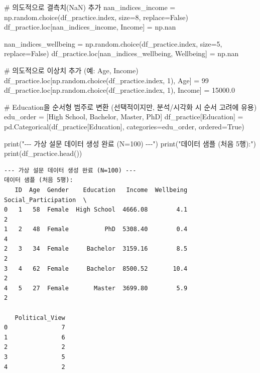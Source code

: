 \documentclass[
  letterpaper,
]{book}
\newenvironment{Shaded}{\begin{snugshade}}{\end{snugshade}}
\newcommand{\BuiltInTok}[1]{\textcolor[rgb]{0.00,0.23,0.31}{#1}}
\newcommand{\CommentTok}[1]{\textcolor[rgb]{0.37,0.37,0.37}{#1}}
\newcommand{\DecValTok}[1]{\textcolor[rgb]{0.68,0.00,0.00}{#1}}
\newcommand{\FloatTok}[1]{\textcolor[rgb]{0.68,0.00,0.00}{#1}}
\newcommand{\NormalTok}[1]{\textcolor[rgb]{0.00,0.23,0.31}{#1}}
\newcommand{\OperatorTok}[1]{\textcolor[rgb]{0.37,0.37,0.37}{#1}}
\newcommand{\StringTok}[1]{\textcolor[rgb]{0.13,0.47,0.30}{#1}}
\newcommand{\VariableTok}[1]{\textcolor[rgb]{0.07,0.07,0.07}{#1}}
\begin{document}
\begin{Shaded}
\begin{Highlighting}[]
\CommentTok{\# 의도적으로 결측치(NaN) 추가}
\NormalTok{nan\_indices\_income }\OperatorTok{=}\NormalTok{ np.random.choice(df\_practice.index, size}\OperatorTok{=}\DecValTok{8}\NormalTok{, replace}\OperatorTok{=}\VariableTok{False}\NormalTok{)}
\NormalTok{df\_practice.loc[nan\_indices\_income, }\StringTok{\textquotesingle{}Income\textquotesingle{}}\NormalTok{] }\OperatorTok{=}\NormalTok{ np.nan}

\NormalTok{nan\_indices\_wellbeing }\OperatorTok{=}\NormalTok{ np.random.choice(df\_practice.index, size}\OperatorTok{=}\DecValTok{5}\NormalTok{, replace}\OperatorTok{=}\VariableTok{False}\NormalTok{)}
\NormalTok{df\_practice.loc[nan\_indices\_wellbeing, }\StringTok{\textquotesingle{}Wellbeing\textquotesingle{}}\NormalTok{] }\OperatorTok{=}\NormalTok{ np.nan}

\CommentTok{\# 의도적으로 이상치 추가 (예: Age, Income)}
\NormalTok{df\_practice.loc[np.random.choice(df\_practice.index, }\DecValTok{1}\NormalTok{), }\StringTok{\textquotesingle{}Age\textquotesingle{}}\NormalTok{] }\OperatorTok{=} \DecValTok{99}
\NormalTok{df\_practice.loc[np.random.choice(df\_practice.index, }\DecValTok{1}\NormalTok{), }\StringTok{\textquotesingle{}Income\textquotesingle{}}\NormalTok{] }\OperatorTok{=} \FloatTok{15000.0}

\CommentTok{\# Education을 순서형 범주로 변환 (선택적이지만, 분석/시각화 시 순서 고려에 유용)}
\NormalTok{edu\_order }\OperatorTok{=}\NormalTok{ [}\StringTok{\textquotesingle{}High School\textquotesingle{}}\NormalTok{, }\StringTok{\textquotesingle{}Bachelor\textquotesingle{}}\NormalTok{, }\StringTok{\textquotesingle{}Master\textquotesingle{}}\NormalTok{, }\StringTok{\textquotesingle{}PhD\textquotesingle{}}\NormalTok{]}
\NormalTok{df\_practice[}\StringTok{\textquotesingle{}Education\textquotesingle{}}\NormalTok{] }\OperatorTok{=}\NormalTok{ pd.Categorical(df\_practice[}\StringTok{\textquotesingle{}Education\textquotesingle{}}\NormalTok{], categories}\OperatorTok{=}\NormalTok{edu\_order, ordered}\OperatorTok{=}\VariableTok{True}\NormalTok{)}

\BuiltInTok{print}\NormalTok{(}\StringTok{"{-}{-}{-} 가상 설문 데이터 생성 완료 (N=100) {-}{-}{-}"}\NormalTok{)}
\BuiltInTok{print}\NormalTok{(}\StringTok{"데이터 샘플 (처음 5행):"}\NormalTok{)}
\BuiltInTok{print}\NormalTok{(df\_practice.head())}
\end{Highlighting}
\end{Shaded}

\begin{verbatim}
--- 가상 설문 데이터 생성 완료 (N=100) ---
데이터 샘플 (처음 5행):
   ID  Age  Gender    Education   Income  Wellbeing  Social_Participation  \
0   1   58  Female  High School  4666.08        4.1                     2   
1   2   48  Female          PhD  5308.40        0.4                     4   
2   3   34  Female     Bachelor  3159.16        8.5                     2   
3   4   62  Female     Bachelor  8500.52       10.4                     2   
4   5   27  Female       Master  3699.80        5.9                     2   

   Political_View  
0               7  
1               6  
2               2  
3               5  
4               2  
\end{verbatim}
\end{document}
